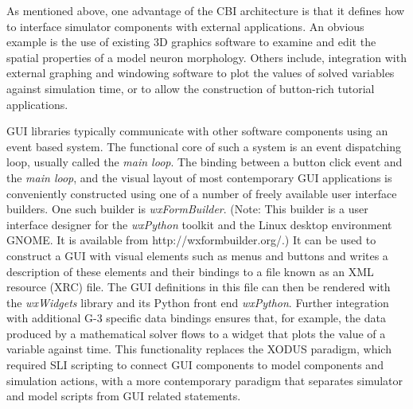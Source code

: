 \documentclass[10pt]{article}
\begin{document}
As mentioned above, one advantage of the CBI architecture is that it defines how to interface simulator components
with external applications.  An obvious example is the use of existing
3D graphics software to examine and edit the spatial properties of a
model neuron morphology.  Others include, integration with external
graphing and windowing software to plot the values of solved
variables against simulation time, or to allow the construction of
button-rich tutorial applications.

GUI libraries typically communicate with other software components
using an event based system.  The functional core of such a system is an
event dispatching loop, usually called the {\it main loop}.
The binding between a button click event and the {\it main loop}, and
the visual layout of most contemporary GUI applications is
conveniently constructed using one of a number of freely available user
interface builders.
%
%
One such builder is {\it wxFormBuilder}.  (Note: This builder is a user interface designer for the {\it
    wxPython} toolkit and the Linux desktop environment GNOME. It is
  available from http://wxformbuilder.org/.) It can be used to construct a GUI with visual elements
such as menus and buttons and writes a description of these elements and
their bindings to a file known as an XML resource (XRC) file. The GUI
definitions in this file can then be rendered with the {\it wxWidgets} library and its Python front end {\it
  wxPython}.  Further integration with additional G-3 specific data
bindings ensures that, for example, the data produced by a
mathematical solver flows to a widget that plots the value of a
variable against time.  This functionality replaces the
XODUS paradigm, which required SLI scripting to connect GUI components
to model components and simulation actions, with a more contemporary
paradigm that separates simulator and model scripts from GUI related
statements.
\end{document}
